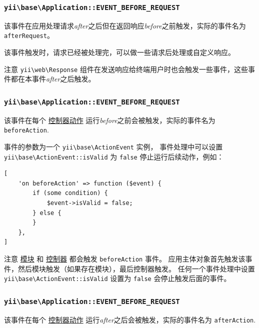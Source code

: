 \subsubsection{\texttt{yii{\allowbreak{}\textbackslash}base{\allowbreak{}\textbackslash}Application\allowbreak{}::\allowbreak{}EVENT\_BEFORE\_REQUEST} \label{structure-applications.md::afterRequest}}
该事件在应用处理请求\textit{after}之后但在返回响应\textit{before}之前触发，实际的事件名为\lstinline|afterRequest|。

该事件触发时，请求已经被处理完，可以做一些请求后处理或自定义响应。

注意 \texttt{yii{\allowbreak{}\textbackslash}web{\allowbreak{}\textbackslash}Response} 组件在发送响应给终端用户时也会触发一些事件，这些事件都在本事件\textit{after}之后触发。

\subsubsection{\texttt{yii{\allowbreak{}\textbackslash}base{\allowbreak{}\textbackslash}Application\allowbreak{}::\allowbreak{}EVENT\_BEFORE\_REQUEST} \label{structure-applications.md::beforeAction}}
该事件在每个 \hyperref[structure-controllers.md]{控制器动作} 运行\textit{before}之前会被触发，实际的事件名为 \lstinline|beforeAction|.

事件的参数为一个 \texttt{yii{\allowbreak{}\textbackslash}base{\allowbreak{}\textbackslash}ActionEvent} 实例，
事件处理中可以设置\texttt{yii{\allowbreak{}\textbackslash}base{\allowbreak{}\textbackslash}ActionEvent\allowbreak{}::\allowbreak{}isValid} 为 \lstinline|false| 停止运行后续动作，例如：

\lstset{language=php}\begin{lstlisting}
[
    'on beforeAction' => function ($event) {
        if (some condition) {
            $event->isValid = false;
        } else {
        }
    },
]
\end{lstlisting}
注意 \hyperref[structure-modules.md]{模块} 和 \hyperref[structure-controllers.md]{控制器} 都会触发 \lstinline|beforeAction| 事件。
应用主体对象首先触发该事件，然后模块触发（如果存在模块），最后控制器触发。
任何一个事件处理中设置 \texttt{yii{\allowbreak{}\textbackslash}base{\allowbreak{}\textbackslash}ActionEvent\allowbreak{}::\allowbreak{}isValid} 设置为 \lstinline|false| 会停止触发后面的事件。

\subsubsection{\texttt{yii{\allowbreak{}\textbackslash}base{\allowbreak{}\textbackslash}Application\allowbreak{}::\allowbreak{}EVENT\_BEFORE\_REQUEST} \label{structure-applications.md::afterAction}}
该事件在每个 \hyperref[structure-controllers.md]{控制器动作} 运行\textit{after}之后会被触发，实际的事件名为 \lstinline|afterAction|.

